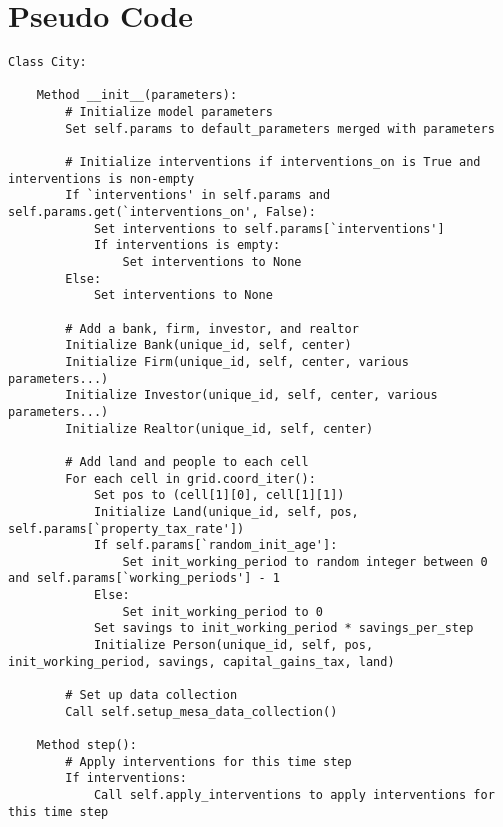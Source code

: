 \chapter{Pseudo Code} \label{appendix-pseudocode}

{\tiny\begin{verbatim} 
Class City:

    Method __init__(parameters):
        # Initialize model parameters
        Set self.params to default_parameters merged with parameters

        # Initialize interventions if interventions_on is True and interventions is non-empty
        If `interventions' in self.params and self.params.get(`interventions_on', False):
            Set interventions to self.params[`interventions']
            If interventions is empty:
                Set interventions to None
        Else:
            Set interventions to None

        # Add a bank, firm, investor, and realtor
        Initialize Bank(unique_id, self, center)
        Initialize Firm(unique_id, self, center, various parameters...)
        Initialize Investor(unique_id, self, center, various parameters...)
        Initialize Realtor(unique_id, self, center)

        # Add land and people to each cell
        For each cell in grid.coord_iter():
            Set pos to (cell[1][0], cell[1][1])
            Initialize Land(unique_id, self, pos, self.params[`property_tax_rate'])
            If self.params[`random_init_age']:
                Set init_working_period to random integer between 0 and self.params[`working_periods'] - 1
            Else:
                Set init_working_period to 0
            Set savings to init_working_period * savings_per_step
            Initialize Person(unique_id, self, pos, init_working_period, savings, capital_gains_tax, land)

        # Set up data collection
        Call self.setup_mesa_data_collection()

    Method step():
        # Apply interventions for this time step
        If interventions:
            Call self.apply_interventions to apply interventions for this time step


\end{verbatim}}
